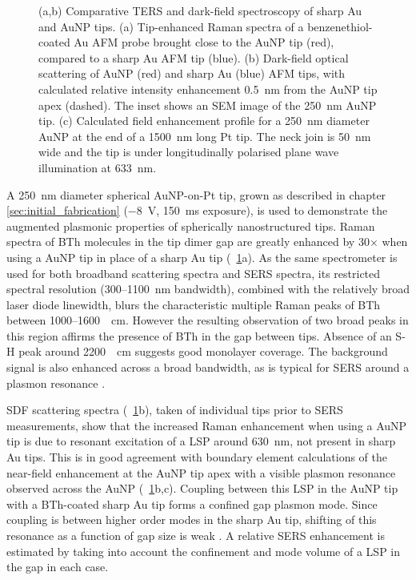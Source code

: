 \documentclass{article}
\begin{document}
\begin{figure}[bt]
{%
(a,b) Comparative TERS and dark-field spectroscopy of sharp Au and AuNP tips. (a) Tip-enhanced Raman spectra of a benzenethiol-coated Au AFM probe brought close to the AuNP tip (red), compared to a sharp Au AFM tip (blue). (b) Dark-field optical scattering of AuNP (red) and sharp Au (blue) AFM tips, with calculated relative intensity enhancement \SI{0.5}{nm} from the AuNP tip apex (dashed). The inset shows an SEM image of the \SI{250}{nm} AuNP tip. %
(c) Calculated field enhancement profile for a \SI{250}{nm} diameter AuNP at the end of a \SI{1500}{nm} long Pt tip. The neck join is \SI{50}{nm} wide and the tip is under longitudinally polarised plane wave illumination at \SI{633}{nm}.}
\label{fig:ters_comparison}
\end{figure}

A \SI{250}{nm} diameter spherical AuNP-on-Pt tip, grown as described in chapter \ref{sec:initial_fabrication} (\SI{-8}{V}, \SI{150}{ms} exposure), is used to demonstrate the augmented plasmonic properties of spherically nanostructured tips. Raman spectra of BTh molecules in the tip dimer gap are greatly enhanced by 30$\times$ when using a AuNP tip in place of a sharp Au tip (\figurename~\ref{fig:ters_comparison}a). As the same spectrometer is used for both broadband scattering spectra and SERS spectra, its restricted spectral resolution (300--\SI{1100}{nm} bandwidth), combined with the relatively broad laser diode linewidth, blurs the characteristic multiple Raman peaks of BTh between 1000--\SI{1600}{\per\centi\metre}. However the resulting observation of two broad peaks in this region affirms the presence of BTh in the gap between tips. Absence of an S-H peak around \SI{2200}{\per\centi\metre} suggests good monolayer coverage. The background signal is also enhanced across a broad bandwidth, as is typical for SERS around a plasmon resonance \cite{mahajan2009}.

SDF scattering spectra (\figurename~\ref{fig:ters_comparison}b), taken of individual tips prior to SERS measurements, show that the increased Raman enhancement when using a AuNP tip is due to resonant excitation of a LSP around \SI{630}{nm}, not present in sharp Au tips. This is in good agreement with boundary element calculations of the near-field enhancement at the AuNP tip apex with a visible plasmon resonance observed across the AuNP (\figurename~\ref{fig:ters_comparison}b,c).
Coupling between this LSP in the AuNP tip with a BTh-coated sharp Au tip forms a confined gap plasmon mode. Since coupling is between higher order modes in the sharp Au tip, shifting of this resonance as a function of gap size is weak \cite{downes2006, hugall2012}. A relative SERS enhancement is estimated by taking into account the confinement and mode volume of a LSP in the gap in each case.
\end{document}
